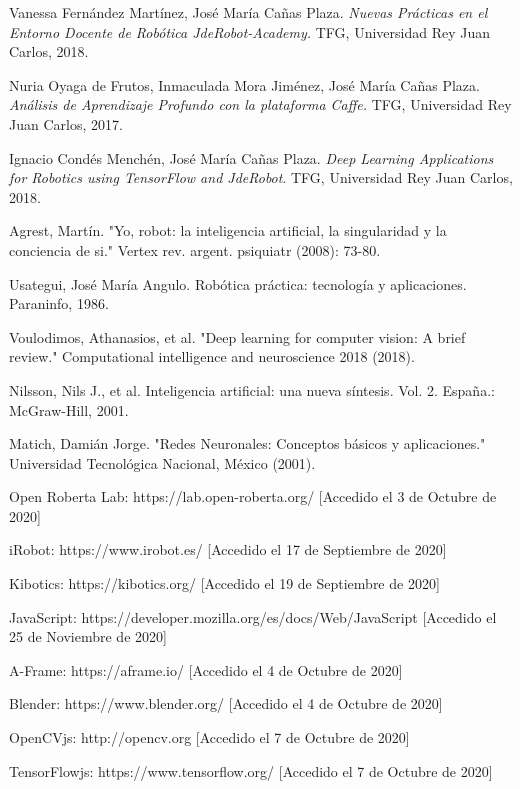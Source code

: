 \documentclass{report}
\begin{document}
\renewcommand{\bibname}{Referencias}
\begin{thebibliography}{0}
   Vanessa Fernández Martínez, José María Cañas Plaza. \textit{Nuevas Prácticas en el Entorno Docente de Robótica JdeRobot-Academy.} TFG, Universidad Rey Juan Carlos, 2018.
  
   Nuria Oyaga de Frutos, Inmaculada Mora Jiménez, José María Cañas Plaza. \textit{Análisis de Aprendizaje Profundo con la plataforma Caffe.} TFG, Universidad Rey Juan Carlos, 2017.
  
   Ignacio Condés Menchén, José María Cañas Plaza. \textit{Deep Learning Applications for Robotics using TensorFlow and JdeRobot}. TFG, Universidad Rey Juan Carlos, 2018.
  
   Agrest, Martín. "Yo, robot: la inteligencia artificial, la singularidad y la conciencia de si." Vertex rev. argent. psiquiatr (2008): 73-80.
  
   Usategui, José María Angulo. Robótica práctica: tecnología y aplicaciones. Paraninfo, 1986.
  
   Voulodimos, Athanasios, et al. "Deep learning for computer vision: A brief review." Computational intelligence and neuroscience 2018 (2018).
  
   Nilsson, Nils J., et al. Inteligencia artificial: una nueva síntesis. Vol. 2. España.: McGraw-Hill, 2001.
  
   Matich, Damián Jorge. "Redes Neuronales: Conceptos básicos y aplicaciones." Universidad Tecnológica Nacional, México (2001).
  
   Open Roberta Lab: https://lab.open-roberta.org/ [Accedido el 3 de Octubre de 2020]
  
   iRobot: https://www.irobot.es/ [Accedido el 17 de Septiembre de 2020]
  
   Kibotics: https://kibotics.org/ [Accedido el 19 de Septiembre de 2020]
  
   JavaScript: https://developer.mozilla.org/es/docs/Web/JavaScript [Accedido el 25 de Noviembre de 2020]
  
   A-Frame: https://aframe.io/ [Accedido el 4 de Octubre de 2020]
  
   Blender: https://www.blender.org/ [Accedido el 4 de Octubre de 2020]
  
   OpenCVjs: http://opencv.org [Accedido el 7 de Octubre de 2020]
  
   TensorFlowjs: https://www.tensorflow.org/ [Accedido el 7 de Octubre de 2020]
  
  
  
  
\end{thebibliography}
\end{document}
